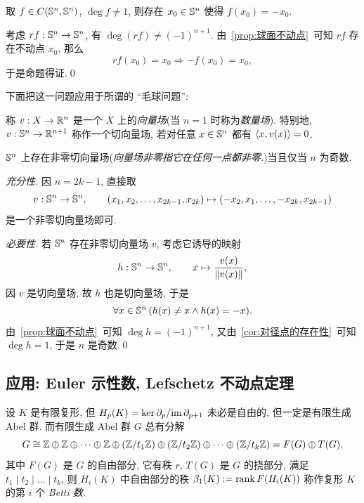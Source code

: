 \begin{Corollary}\label{cor:对径点的存在性}
	取 $ f\in C(\S^n,\S^n) $, $ \deg f\ne 1 $, 则存在 $ x_0\in\S^n $ 使得 $ f(x_0)=-x_0 $.
\end{Corollary}
\begin{Proof}
	考虑 $ rf : \S^n\to\S^n $, 有 $ \deg(rf)\ne(-1)^{n+1} $. 由~\ref{prop:球面不动点}~可知 $ rf $ 存在不动点 $ x_0 $, 那么
	\[
		rf(x_0)=x_0\Longrightarrow -f(x_0)=x_0,
	\]
	于是命题得证.\qed
\end{Proof}

下面把这一问题应用于所谓的 ``毛球问题'':

\begin{Definition}[向量场]
	称 $ v : X\to\R^n $ 是一个 $ X $ 上的\emph{向量场}(当 $ n=1 $ 时称为\emph{数量场}). 特别地, $ v : \S^n\to\R^{n+1} $ 称作一个切向量场, 若对任意 $ x\in\S^n $ 都有 $ \lrangle{x,v(x)}=0 $.
\end{Definition}

\begin{Corollary}\label{cor:毛球定理}
	$ \S^n $ 上存在非零切向量场(\textit{向量场非零指它在任何一点都非零.})当且仅当 $ n $ 为奇数.
\end{Corollary}
\begin{Proof}
	\textit{充分性.} 因 $ n=2k-1 $, 直接取
	\[
		v : \S^n\to\S^n,\qquad (x_1,x_2,\dots,x_{2k-1},x_{2k})\mapsto(-x_2,x_1,\dots,-x_{2k},x_{2k-1})
	\]
	是一个非零切向量场即可.

	\textit{必要性.} 若 $ \S^n $ 存在非零切向量场 $ v $, 考虑它诱导的映射
	\[
		h : \S^n\to\S^n,\qquad x\mapsto\frac{v(x)}{\norm{v(x)}},
	\]
	因 $ v $ 是切向量场, 故 $ h $ 也是切向量场, 于是
	\[
		\forall x\in\S^n\,(h(x)\ne x\land h(x)=-x).
	\]
	由~\ref{prop:球面不动点}~可知 $ \deg h=(-1)^{n+1} $, 又由~\ref{cor:对径点的存在性}~可知 $ \deg h=1 $, 于是 $ n $ 是奇数.\qed
\end{Proof}

\subsection{应用: Euler 示性数, Lefschetz 不动点定理}

设 $ K $ 是有限复形, 但 $ H_p(K)=\ker\partial_p/\im\partial_{p+1} $ 未必是自由的, 但一定是有限生成 Abel 群. 而有限生成 Abel 群 $ G $ 总有分解
	\[
		G\cong\Z\oplus\Z\oplus\dots\oplus\Z\oplus(\Z/t_1\Z)\oplus(\Z/t_2\Z)\oplus\dots\oplus(\Z/t_k\Z)=F(G)\oplus T(G),
	\]
	其中 $ F(G) $ 是 $ G $ 的自由部分, 它有秩 $ r $, $ T(G) $ 是 $ G $ 的挠部分, 满足 $ t_1\mid t_2\mid\dots\mid t_k $, 则 $ H_i(K) $ 中自由部分的秩 $ \beta_1(K):=\rank F(H_i(K)) $ 称作复形 $ K $ 的第 $ i $ 个 \emph{Betti 数}.

